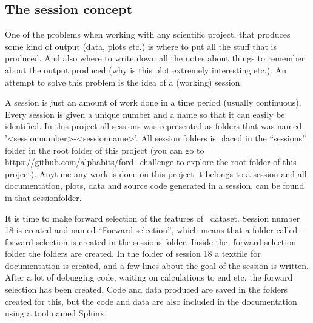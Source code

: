 \subsection{The session concept}
One of the problems when working with any scientific project, that produces some kind of output (data, plots etc.) is where to put all the stuff that is produced. And also where to write down all the notes about things to remember about the output produced (why is this plot extremely interesting etc.). An attempt to solve this problem is the idea of a (working) session. \par
A session is just an amount of work done in a time period (usually continuous). Every session is given a unique number and a name so that it can easily be identified. In this project all sessions was represented as folders that was named '<sessionnumber>-<sessionname>'. All session folders is placed in the ``sessions'' folder in the root folder of this project (you can go to \url{https://github.com/alphabits/ford_challenge} to explore the root folder of this project). Anytime any work is done on this project it belongs to a session and all documentation, plots, data and source code generated in a session, can be found in that sessionfolder.
\begin{Exa}
    It is time to make forward selection of the features of \TFC\ dataset. Session number 18 is created and named ``Forward selection'', which means that a folder called {-forward-selection} is created in the {\ttfamily sessions}-folder. Inside the {-forward-selection} folder the folders  are created. In the folder of session 18 a textfile for documentation is created, and a few lines about the goal of the session is written. After a lot of debugging code, waiting on calculations to end etc. the forward selection has been created. Code and data produced are saved in the folders created for this, but the code and data are also included in the documentation using a tool named Sphinx.
\end{Exa}


